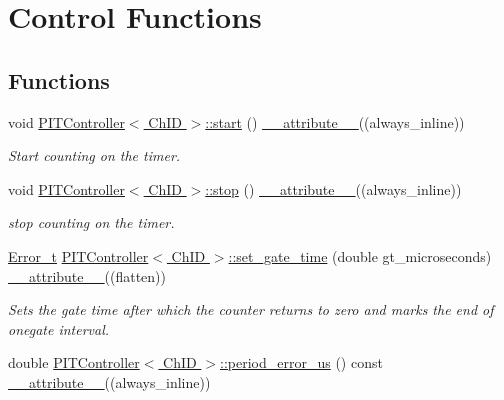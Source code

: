 \hypertarget{group__Controls}{}\section{\textquotesingle{}\textquotesingle{}Control Functions\textquotesingle{}\textquotesingle{}}
\label{group__Controls}
\subsection*{Functions}
\begin{DoxyCompactItemize}
\item 
void \hyperlink{group__Controls_ga4dae1ed0ada64ebc03665e8f39795e7e}{P\+I\+T\+Controller$<$ Ch\+I\+D $>$\+::start} () \hyperlink{utilities_8hpp_a103d5b3998e0dd804213c8f30a094f4d}{\+\_\+\+\_\+attribute\+\_\+\+\_\+}((always\+\_\+inline))
\begin{DoxyCompactList}\small\item\em Start counting on the timer. \end{DoxyCompactList}\item 
void \hyperlink{group__Controls_ga5a6e2b00c6355934531a77a62660bec7}{P\+I\+T\+Controller$<$ Ch\+I\+D $>$\+::stop} () \hyperlink{utilities_8hpp_a103d5b3998e0dd804213c8f30a094f4d}{\+\_\+\+\_\+attribute\+\_\+\+\_\+}((always\+\_\+inline))
\begin{DoxyCompactList}\small\item\em stop counting on the timer. \end{DoxyCompactList}\item 
\hyperlink{errors_8hpp_a4e8c0d09726859e3d3369c0da5a1aa7f}{Error\+\_\+t} \hyperlink{group__Controls_gaaf7a79129a4ea5af057ea8f537b7ae9f}{P\+I\+T\+Controller$<$ Ch\+I\+D $>$\+::set\+\_\+gate\+\_\+time} (double gt\+\_\+microseconds) \hyperlink{utilities_8hpp_a103d5b3998e0dd804213c8f30a094f4d}{\+\_\+\+\_\+attribute\+\_\+\+\_\+}((flatten))
\begin{DoxyCompactList}\small\item\em Sets the gate time after which the counter returns to zero and marks the end of onegate interval. \end{DoxyCompactList}\item 
double \hyperlink{group__Controls_ga3fedb5ff5a44b664e8132f4e2836b155}{P\+I\+T\+Controller$<$ Ch\+I\+D $>$\+::period\+\_\+error\+\_\+us} () const \hyperlink{utilities_8hpp_a103d5b3998e0dd804213c8f30a094f4d}{\+\_\+\+\_\+attribute\+\_\+\+\_\+}((always\+\_\+inline))

\end{DoxyCompactItemize}
